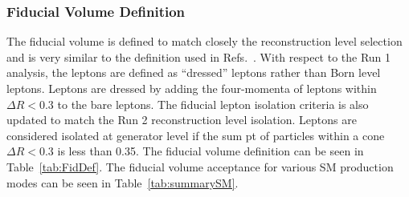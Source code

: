 \subsubsection{Fiducial Volume Definition}

The fiducial volume is defined to match closely the reconstruction level selection and is very similar to the definition
used in Refs.~\cite{CMSH4lFiducial8TeV}. With respect to the Run 1 analysis, 
the leptons are defined as ``dressed'' leptons rather than Born level leptons. 
Leptons are dressed by adding the four-momenta of leptons within $\Delta R<0.3$ to the bare leptons.  
The fiducial lepton isolation criteria is also updated to match the Run 2 reconstruction level isolation. Leptons are considered isolated at generator level if the sum pt of particles within a cone  $\Delta R<0.3$ is less than 0.35.
The fiducial volume definition can be seen in Table~\ref{tab:FidDef}. 
The fiducial volume acceptance for various SM production modes can be seen in Table~\ref{tab:summarySM}.

